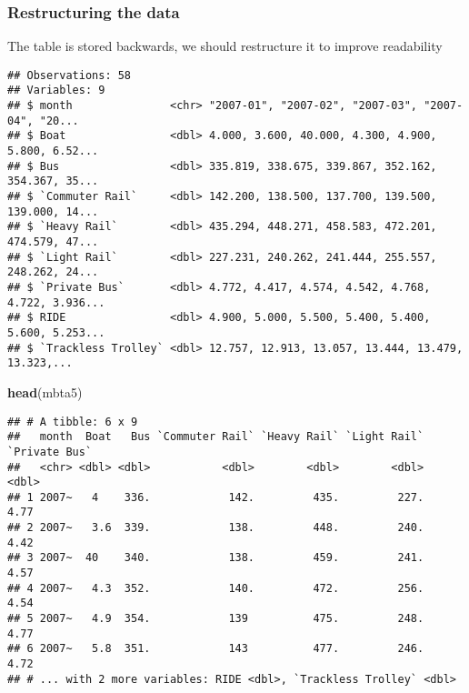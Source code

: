 \documentclass[]{article}
\newenvironment{Shaded}{\begin{snugshade}}{\end{snugshade}}
\newcommand{\CommentTok}[1]{\textcolor[rgb]{0.56,0.35,0.01}{\textit{#1}}}
\newcommand{\KeywordTok}[1]{\textcolor[rgb]{0.13,0.29,0.53}{\textbf{#1}}}
\newcommand{\NormalTok}[1]{#1}
\newcommand{\OperatorTok}[1]{\textcolor[rgb]{0.81,0.36,0.00}{\textbf{#1}}}
\newcommand{\StringTok}[1]{\textcolor[rgb]{0.31,0.60,0.02}{#1}}
\begin{document}
\hypertarget{restructuring-the-data}{%
\subsubsection{Restructuring the data}\label{restructuring-the-data}}

The table is stored backwards, we should restructure it to improve
readability

\begin{Shaded}
\end{Shaded}

\begin{verbatim}
## Observations: 58
## Variables: 9
## $ month               <chr> "2007-01", "2007-02", "2007-03", "2007-04", "20...
## $ Boat                <dbl> 4.000, 3.600, 40.000, 4.300, 4.900, 5.800, 6.52...
## $ Bus                 <dbl> 335.819, 338.675, 339.867, 352.162, 354.367, 35...
## $ `Commuter Rail`     <dbl> 142.200, 138.500, 137.700, 139.500, 139.000, 14...
## $ `Heavy Rail`        <dbl> 435.294, 448.271, 458.583, 472.201, 474.579, 47...
## $ `Light Rail`        <dbl> 227.231, 240.262, 241.444, 255.557, 248.262, 24...
## $ `Private Bus`       <dbl> 4.772, 4.417, 4.574, 4.542, 4.768, 4.722, 3.936...
## $ RIDE                <dbl> 4.900, 5.000, 5.500, 5.400, 5.400, 5.600, 5.253...
## $ `Trackless Trolley` <dbl> 12.757, 12.913, 13.057, 13.444, 13.479, 13.323,...
\end{verbatim}

\begin{Shaded}
\begin{Highlighting}[]
\KeywordTok{head}\NormalTok{(mbta5)}
\end{Highlighting}
\end{Shaded}

\begin{verbatim}
## # A tibble: 6 x 9
##   month  Boat   Bus `Commuter Rail` `Heavy Rail` `Light Rail` `Private Bus`
##   <chr> <dbl> <dbl>           <dbl>        <dbl>        <dbl>         <dbl>
## 1 2007~   4    336.            142.         435.         227.          4.77
## 2 2007~   3.6  339.            138.         448.         240.          4.42
## 3 2007~  40    340.            138.         459.         241.          4.57
## 4 2007~   4.3  352.            140.         472.         256.          4.54
## 5 2007~   4.9  354.            139          475.         248.          4.77
## 6 2007~   5.8  351.            143          477.         246.          4.72
## # ... with 2 more variables: RIDE <dbl>, `Trackless Trolley` <dbl>
\end{verbatim}
\end{document}
